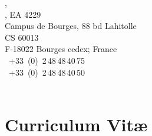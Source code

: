 \begin{minipage}{.34\linewidth}\draftHrule
  \small\sffamily\mdseries\upshape
    {\normalsize\INSA \CVL,} \\
    {, \PRISMEshort EA 4229} \\
    {Campus de Bourges,  88 bd Lahitolle}\\
    {CS 60013}\\
    {F-18022 Bourges cedex; France} \\
    ~{+33~(0)~2\,48\,48\,40\,75}\\
    ~{+33~(0)~2\,48\,48\,40\,50}  \\
    ~ 
\end{minipage}

\HDRskip

\section{Curriculum Vit\ae}



